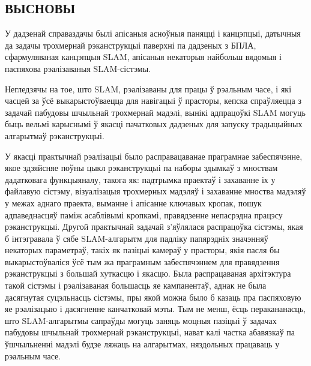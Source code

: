 \begin{center}
    \section*{ВЫСНОВЫ}
\end{center}

\vspace{5mm}

У дадзенай справаздачы былі апісаныя асноўныя паняцці і канцэпцыі,
датычныя да задачы трохмернай рэканструкцыі паверхні па дадзеных з БПЛА,
сфармуляваная канцэпцыя SLAM, апісаныя некаторыя
найбольш вядомыя і паспяхова рэалізаваныя SLAM-сістэмы.

Негледзячы на тое, што SLAM, рэалізаваны для працы ў рэальным часе, і які часцей за ўсё выкарыстоўваецца
для навігацыі ў прасторы, кепска спраўляецца з задачай пабудовы шчыльнай трохмернай
мадэлі, вынікі адпрацоўкі SLAM могуць быць вельмі карыснымі ў якасці пачатковых
дадзеных для запуску традыцыйных алгарытмаў рэканструкцыі.

У якасці практычнай рэалізацыі было расправацаванае праграмнае забеспячэнне, якое здзяйсняе
поўны цыкл рэканструкцыі па наборы здымкаў з мноствам дадатковага функцыяналу, такога як:
падтрымка праектаў і захаванне іх у файлавую сістэму, візуалізацыя трохмерных мадэляў
і захаванне мноства мадэляў у межах аднаго праекта, выманне і апісанне ключавых кропак,
пошук адпаведнасцяў паміж асаблівымі кропкамі, правядзенне
непасрэдна працэсу рэканструкцыі. Другой практычнай задачай з'яўлялася распрацоўка
сістэмы, якая б інтэгравала ў сябе SLAM-алгарытм для падліку папярэдніх значэнняў некаторых
параметраў, такіх як пазіцыі камераў у прасторы,
якія пасля бы выкарыстоўваліся ўсё тым жа праграмным забеспячэннем
для правядзення рэканструкцыі з большай хуткасцю і якасцю. Была распрацаваная архітэктура
такой сістэмы і рэалізаваная большасць яе кампанентаў, аднак не была дасягнутая
суцэльнасць сістэмы, пры якой можна было б казаць пра паспяховую яе рэалізацыю і дасягненне канчатковай мэты.
Тым не менш, ёсць перакананасць, што SLAM-алгарытмы сапраўды могуць заняць моцныя пазіцыі ў задачах
пабудовы шчыльнай трохмернай рэканструкцыі, нават калі частка абавязкаў па ўшчыльненні мадэлі
будзе ляжаць на алгарытмах, няздольных працаваць у рэальным часе.

\newpage
